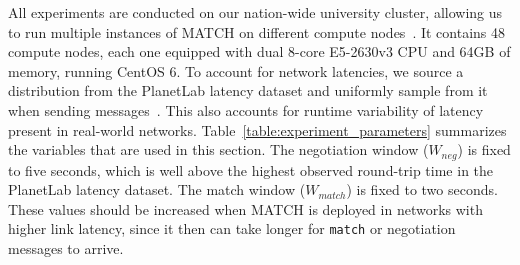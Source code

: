 All experiments are conducted on our nation-wide university cluster, allowing us to run multiple instances of MATCH on different compute nodes~\cite{bal2016medium}.
It contains 48 compute nodes, each one equipped with dual 8-core E5-2630v3 CPU and 64GB of memory, running CentOS 6.
To account for network latencies, we source a distribution from the PlanetLab latency dataset and uniformly sample from it when sending messages~\cite{zhu2016network}.
This also accounts for runtime variability of latency present in real-world networks.
Table~\ref{table:experiment_parameters} summarizes the variables that are used in this section.
The negotiation window ($ W_{neg} $) is fixed to five seconds, which is well above the highest observed round-trip time in the PlanetLab latency dataset.
The match window ($ W_{match} $) is fixed to two seconds.
These values should be increased when MATCH is deployed in networks with higher link latency, since it then can take longer for \texttt{match} or negotiation messages to arrive.


